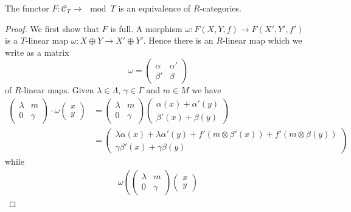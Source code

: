
\begin{proposition}\label{3.4.2}
The functor $F:\mathcal{C}_T\to\mod T$ is an equivalence of $R$-categories.
\end{proposition}


\begin{proof}
We first show that $F$ is full. A morphism $\omega:F(X,Y,f)\to F(X',Y',f')$ is a $T$-linear map $\omega:X\oplus Y\to X'\oplus Y'$. Hence there is an $R$-linear map which we write as a matrix
\[
\omega=\begin{pmatrix}
\alpha & \alpha' \\
\beta' & \beta
\end{pmatrix}
\]
of $R$-linear maps. Given $\lambda\in\Lambda$, $\gamma\in\Gamma$ and $m\in M$ we have
\begin{align*}
\begin{pmatrix}
\lambda & m \\
0 & \gamma
\end{pmatrix}
\cdot
\omega
\begin{pmatrix}
x \\ y
\end{pmatrix}
& =
\begin{pmatrix}
\lambda & m \\
0 & \gamma
\end{pmatrix}
\begin{pmatrix}
\alpha(x) + \alpha'(y) \\ \beta'(x) + \beta(y)
\end{pmatrix} \\
& =
\begin{pmatrix}
\lambda\alpha(x) + \lambda \alpha'(y) + f'(m\otimes \beta'(x)) + f'(m\otimes \beta(y)) \\
\gamma\beta'(x) + \gamma\beta(y)
\end{pmatrix}
\end{align*}
%
while
\begin{align*}
\omega\left(
\begin{pmatrix}
\lambda & m \\
0 & \gamma
\end{pmatrix}
\begin{pmatrix}
x \\ y

\end{pmatrix}
\end{align*}
\end{proof}
